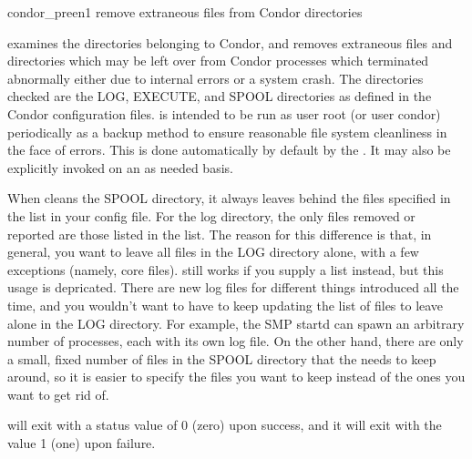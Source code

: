 \begin{ManPage}{\label{man-condor-preen}condor\_preen}{1}
{remove extraneous files from Condor directories}
\Synopsis {}


\Description 

 examines the directories belonging to Condor, 
and removes extraneous files and directories which may be left over from
Condor processes which terminated abnormally either due to internal errors or
a system crash. The directories checked are the LOG, EXECUTE, and SPOOL
directories as defined in the Condor configuration files.  is
intended to be run as user root (or user condor) periodically as a backup
method to ensure reasonable file system cleanliness in the face of
errors. This is done automatically by default by the . 
It may also be explicitly invoked on an as needed basis.

When  cleans the SPOOL directory, it always leaves
behind the files specified in the  list in
your config file.
For the log directory, the only files removed or reported are those
listed in the   list.
The reason for this difference is that, in general, you want to leave
all files in the LOG directory alone, with a few exceptions (namely,
core files).
 still works if you supply a 
list instead, but this usage is depricated.
There are new log files for different things introduced all the time,
and you wouldn't want to have to keep updating the list of files to
leave alone in the LOG directory.
For example, the SMP startd can spawn an arbitrary number of
 processes, each with its own log file.  
On the other hand, there are only a small, fixed number of files in
the SPOOL directory that the  needs to keep around, so
it is easier to specify the files you want to keep instead of the ones
you want to get rid of.

\begin{Options}




\end{Options}

\ExitStatus

 will exit with a status value of 0 (zero) upon success,
and it will exit with the value 1 (one) upon failure.

\end{ManPage}
